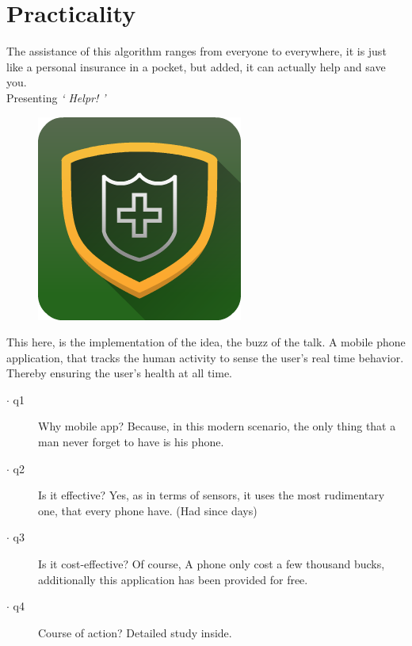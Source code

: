 \section{Practicality}
\label{sec:sec03}



The assistance of this algorithm ranges from everyone to everywhere, it is just like a personal insurance in a pocket, but added, it can actually help and save you.\\
Presenting {\Large \textit{` Helpr! ' }} \\
\begin{figure}[h]
	\centering
	\includegraphics[height=0.35\textheight]{fig01/icon}
	\label{fig:RHP01}
\end{figure}
 
 This here, is the implementation of the idea, the buzz of the talk.
A mobile phone application, that tracks the human activity to sense the user's real time behavior.
Thereby ensuring the user's health at all time.\\
\begin{description}
\item[$\cdot$ q1]Why mobile app? Because, in this modern scenario, the only thing that a man never forget to have is his phone.
\item[$\cdot$ q2]Is it effective? Yes, as in terms of sensors, it uses the most rudimentary one, that every phone have. (Had since days)
\item[$\cdot$ q3]Is it cost-effective? Of course, A phone only cost a few thousand bucks, additionally this application has been provided for free.
\item[$\cdot$ q4]Course of action? Detailed study inside.
 \end{description}
 
